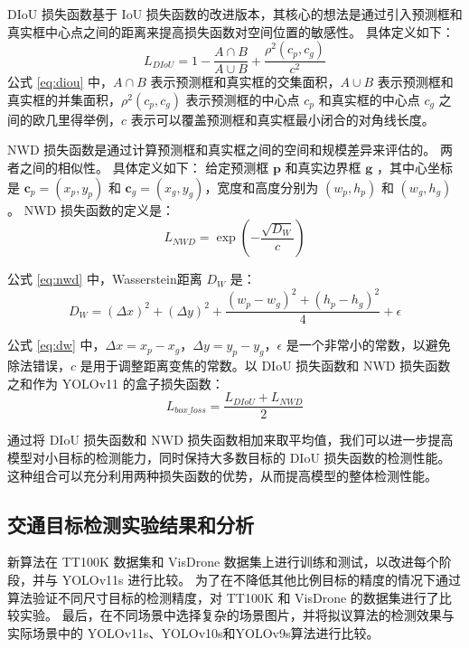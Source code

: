 DIoU 损失函数基于 IoU 损失函数的改进版本，其核心的想法是通过引入预测框和真实框中心点之间的距离来提高损失函数对空间位置的敏感性。
具体定义如下：
\begin{equation}
    \label{eq:diou}
    L_{DIoU} = 1 - \frac{A\cap{B}}{A\cup{B}} + \frac{\rho^2(c_p, c_g)}{c^2}
\end{equation}
公式 \ref{eq:diou} 中，$A\cap{B}$ 表示预测框和真实框的交集面积，$A\cup{B}$ 表示预测框和真实框的并集面积，$\rho^2(c_p, c_g)$ 表示预测框的中心点 $c_p$ 和真实框的中心点 $c_g$ 之间的欧几里得举例，$c$ 表示可以覆盖预测框和真实框最小闭合的对角线长度。

NWD 损失函数是通过计算预测框和真实框之间的空间和规模差异来评估的。 两者之间的相似性。
具体定义如下：
给定预测框 $\mathbf{p}$ 和真实边界框 $\mathbf{g}$ ，其中心坐标是 $\mathbf{c}_p = (x_p, y_p)$ 和 $\mathbf{c}_g = (x_g, y_g)$，宽度和高度分别为 $(w_p, h_p)$ 和 $(w_g, h_g)$。 NWD 损失函数的定义是：
\begin{equation}
    L_{NWD} = \exp\left(-\frac{\sqrt{D_W}}{c}\right)
    \label{eq:nwd}
\end{equation}

公式 \eqref{eq:nwd} 中，Wasserstein距离 $D_W$ 是：
\begin{equation}
    D_W = (\Delta x)^2 + (\Delta y)^2 + \frac{(w_p - w_g)^2 + (h_p - h_g)^2}{4} + \epsilon
    \label{eq:dw}
\end{equation}

公式 \eqref{eq:dw} 中，$\Delta x = x_p - x_g$，$\Delta y = y_p - y_g$，$\epsilon$ 是一个非常小的常数，以避免除法错误，$c$ 是用于调整距离变焦的常数。以 DIoU 损失函数和 NWD 损失函数之和作为 YOLOv11 的盒子损失函数：
\begin{equation}
    L_{box\_loss} = \frac{L_{DIoU}+L_{NWD}}{2}
\end{equation}

通过将 DIoU 损失函数和 NWD 损失函数相加来取平均值，我们可以进一步提高模型对小目标的检测能力，同时保持大多数目标的 DIoU 损失函数的检测性能。
这种组合可以充分利用两种损失函数的优势，从而提高模型的整体检测性能。


\subsection{交通目标检测实验结果和分析}

新算法在 TT100K 数据集\cite{tt100k}和 VisDrone 数据集\cite{vd}上进行训练和测试，以改进每个阶段，并与 YOLOv11s\cite{yolov11} 进行比较。
为了在不降低其他比例目标的精度的情况下通过算法验证不同尺寸目标的检测精度，对 TT100K 和 VisDrone 的数据集进行了比较实验。
最后，在不同场景中选择复杂的场景图片，并将拟议算法的检测效果与实际场景中的 YOLOv11s、YOLOv10s\cite{yolov10}和YOLOv9s\cite{yolov9}算法进行比较。

